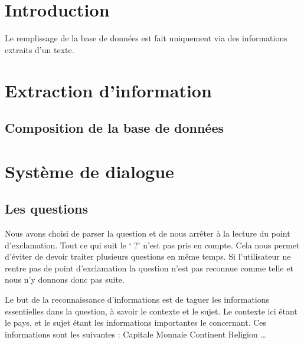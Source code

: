 \documentclass[11pt,a4paper]{article}
\begin{document}



\section{Introduction}

Le remplissage de la base de données est fait uniquement via des informations extraits d'un texte.

\section{Extraction d'information}
\subsection{Composition de la base de données}

\section{Système de dialogue}

\subsection{Les questions}

Nous avons choisi de parser la question et de nous arrêter à la lecture du point d’exclamation. Tout ce qui suit le ‘ ?’ n’est pas pris en compte. Cela nous permet d’éviter de devoir traiter plusieurs questions en même temps. Si l’utilisateur ne rentre pas de point d’exclamation la question n’est pas reconnue comme telle et nous n’y donnons donc pas suite.
 
Le but de la reconnaissance d’informations est de taguer les informations essentielles dans la question, à savoir le contexte et le sujet. Le contexte ici étant le pays, et le sujet étant les informations importantes le concernant. Ces informations sont les suivantes :
Capitale
Monnaie
Continent
Religion
…
\end{document}
